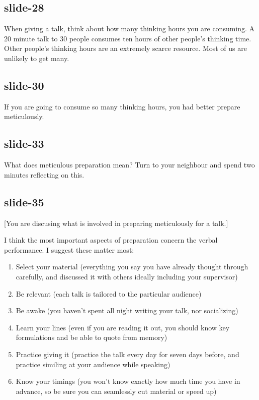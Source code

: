 \documentclass[12pt,\papersize]{extarticle}
\begin{document}
\subsection{slide-28}
When giving a talk, think about how many thinking hours you are consuming.
A 20 minute talk to 30 people consumes ten hours of other people's thinking time.
Other people's thinking hours are an extremely scarce resource.
Most of us are unlikely to get many.
 
\subsection{slide-30}
If you are going to consume so many thinking hours, you had better prepare meticulously.
 
\subsection{slide-33}
What does meticulous preparation mean?
Turn to your neighbour and spend two minutes reflecting on this.
 
\subsection{slide-35}
[You are discusing what is involved in preparing meticulously for a talk.]
 
I think the most important aspects of preparation concern the verbal performance.
I suggest these matter most:
\begin{enumerate}
\item Select your material (everything you say you have already thought through carefully, and discussed it with others ideally including your supervisor)
\item Be relevant (each talk is tailored to the particular audience)
\item Be awake (you haven't spent all night writing your talk, nor socializing)
\item Learn your lines (even if you are reading it out, you should know key formulations and be able to quote from memory)
\item Practice giving it  (practice the talk every day for seven days before, and practice similing at your audience while speaking) 
\item Know your timings (you won't know exactly how much time you have in advance, so be sure you can seamlessly cut material or speed up)
\end{enumerate}
 
\end{document}
